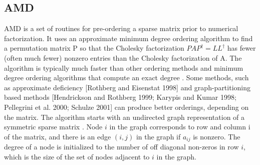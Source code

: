 \subsection{AMD}
AMD is a set of routines for pre-ordering a sparse matrix prior
to numerical factorization. It uses an approximate minimum
degree ordering algorithm to find a permutation matrix P so
that the Cholesky factorization $PAP^\dag =LL^\dag$ has fewer
(often much fewer) nonzero entries than the Cholesky
factorization of A. The algorithm is typically much faster than
other ordering methods and minimum degree ordering algorithms
that compute an exact degree . Some methods, such as
approximate deficiency [Rothberg and Eisenstat 1998] and
graph-partitioning based methods [Hendrickson and Rothberg
1999; Karypis and Kumar 1998; Pellegrini et al. 2000; Schulze
2001] can produce better orderings, depending on the matrix.
The algorithm starts with an undirected graph representation of
a symmetric sparse matrix . Node $i$ in the graph corresponds
to row and column i of the matrix, and there is an edge $(i,
j)$ in the graph if $a_{ij}$ is nonzero. The degree of a node
is initialized to the number of off diagonal non-zeros in row
$i$, which is the size of the set of nodes adjacent to $i$ in
the graph.
